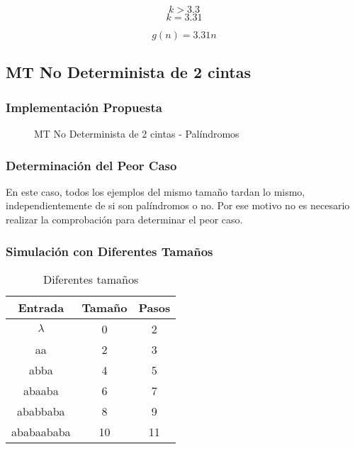 \documentclass{uc3mpracticas}
\begin{document}
  $$ k > 3.3 $$
  $$ k = 3.31 $$

  $$ g(n) = 3.31n $$


  \subsection{MT No Determinista de 2 cintas}

  \subsubsection{Implementación Propuesta}

  \begin{figure}[!h]
    \caption{MT No Determinista de 2 cintas - Palíndromos}
  \end{figure}


  \subsubsection{Determinación del Peor Caso}

  En este caso, todos los ejemplos del mismo tamaño tardan lo mismo, independientemente de si son palíndromos o no. Por ese motivo no es necesario realizar la comprobación para determinar el peor caso.

  \subsubsection{Simulación con Diferentes Tamaños}

  \begin{table}[!h]
    \centering
  \begin{tabular}{|c|c|c|}
  \hline

  \textbf{Entrada} & \textbf{Tamaño} & \textbf{Pasos} \\ \hline

  $\lambda$           & 0               & 2              \\ \hline
  aa               & 2               & 3              \\ \hline
  abba             & 4               & 5              \\ \hline
  abaaba           & 6               & 7              \\ \hline
  ababbaba         & 8               & 9              \\ \hline
  ababaababa       & 10              & 11             \\ \hline
  \end{tabular}
  \caption{Diferentes tamaños}
  \end{table}
\end{document}
